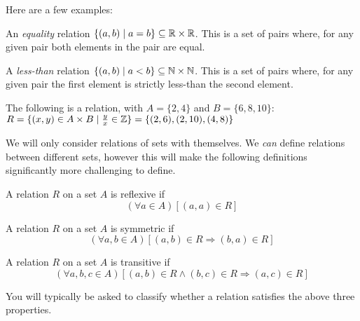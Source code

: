 \documentclass[main.tex]{subfiles}
\begin{document}
Here are a few examples:

\begin{example}
	An \textit{equality} relation \(\{(a,b) \mid a = b\} \subseteq \mathbb{R} \times \mathbb{R}\). This is a set of pairs where, for any given pair both elements in the pair are equal.
\end{example}

\begin{example}
	A \textit{less-than} relation \(\{(a,b) \mid a < b\} \subseteq \mathbb{N} \times \mathbb{N}\). This is a set of pairs where, for any given pair the first element is strictly less-than the second element.
\end{example}

\begin{example}
	The following is a relation, with \(A = \{2,4\}\) and \(B = \{6,8,10\}\): \(R = \{(x,y) \in A \times B \mid \frac{y}{x} \in \mathbb{Z}\} = \{(2,6), (2,10), (4,8)\}\)
\end{example}

\begin{rem}
	We will only consider relations of sets with themselves. We \textit{can} define relations between different sets, however this will make the following definitions significantly more challenging to define.
\end{rem}

\begin{defn}
	A relation \(R\) on a set \(A\) is reflexive if \[(\forall a \in A)[(a,a) \in R]\]
\end{defn}

\begin{defn}
	A relation \(R\) on a set \(A\) is symmetric if \[(\forall a,b \in A)[(a,b) \in R \Rightarrow (b,a) \in R]\]
\end{defn}

\begin{defn}
	A relation \(R\) on a set \(A\) is transitive if \[(\forall a,b,c \in A)[(a,b) \in R \land (b,c) \in R \Rightarrow (a,c) \in R]\]
\end{defn}

You will typically be asked to classify whether a relation satisfies the above three properties.
\end{document}
